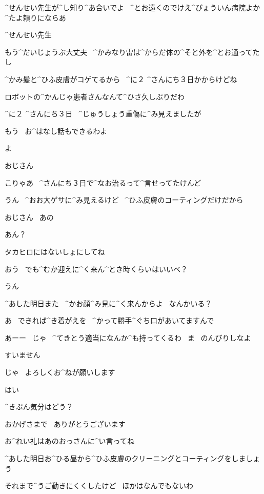 \Ojisan ^{せんせい}{先生}が^{し}{知}り^{あ}{合}いでよ
\ ^{とお}{遠}くのでけえ^{びょういん}{病院}よか^{たよ}{頼}りにならあ

\page[88]
\Ojisan ^{せんせい}{先生}

\Sensei もう^{だいじょうぶ}{大丈夫}
\ ^{かみなり}{雷}は^{からだ}{体}の^{そと}{外}を^{とお}{通}ってたし

\Sensei ^{かみ}{髪}と^{ひふ}{皮膚}がコゲてるから
\ ^{に}{２} ^{さんにち}{３日}かからけどね

\Sensei ロボットの^{かんじゃ}{患者}さんなんて^{ひさ}{久}しぶりだわ

\Ojisan ^{に}{２} ^{さんにち}{３日}
\ ^{じゅうしょう}{重傷}に^{み}{見}えましたが

\Sensei もう
\ お^{はなし}{話}もできるわよ

\page
\Ojisan よ

\Alpha おじさん

\Ojisan こりゃあ
\ ^{さんにち}{３日}で^{なお}{治}るって^{言}{せ}ってたけんど

\Alpha うん
\ ^{おお}{大}ゲサに^{み}{見}えるけど
\ ^{ひふ}{皮膚}のコーティングだけだから

\Alpha おじさん
\ あの

\Ojisan あん？

\Alpha タカヒロにはないしょにしてね

\page
\Ojisan おう
\ でも^{むか}{迎}えに^{く}{来}ん^{とき}{時}くらいはいいべ？

\Alpha うん

\Ojisan ^{あした}{明日}また
\ ^{かお}{顔}^{み}{見}に^{く}{来}んからよ
\ なんかいる？

\Alpha あ
\ できれば^{き}{着}がえを
\ ^{かって}{勝手}^{ぐち}{口}があいてますんで

\Ojisan あーー
\ じゃ
\ ^{てきとう}{適当}になんか^{も}{持}ってくるわ
\ ま
\ のんびりしなよ

\Alpha すいません

\Ojisan じゃ
\ よろしくお^{ねが}{願}いします

\Sensei はい

\page
\Sensei ^{きぶん}{気分}はどう？

\Alpha おかげさまで
\ ありがとうございます

\Sensei お^{れい}{礼}はあのおっさんに^{い}{言}ってね

\Sensei ^{あした}{明日}お^{ひる}{昼}から^{ひふ}{皮膚}のクリーニングとコーティングをしましょう

\Sensei それまで^{うご}{動}きにくくしたけど
\ ほかはなんでもないわ

